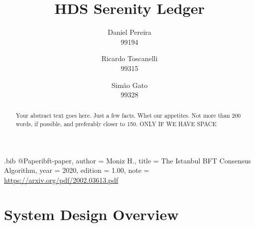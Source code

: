 \usepackage{filecontents}

\begin{filecontents}{\jobname.bib}
@Paper{ibft-paper,
  author =       {Moniz H.},
  title =        {The Istanbul BFT Consensus Algorithm},
  year =         2020,
  edition =      {1.00},
  note =         {\url{https://arxiv.org/pdf/2002.03613.pdf}}
}
\end{filecontents}



\date{}

\title{\Large \bf HDS Serenity Ledger}

\author{
{\rm Daniel Pereira}\\
99194
\and
{\rm Ricardo Toscanelli}\\
99315
\and
{\rm Simão Gato}\\
99328
} %

\maketitle

\begin{abstract}
Your abstract text goes here. Just a few facts. Whet our appetites.
Not more than 200 words, if possible, and preferably closer to 150.
ONLY IF WE HAVE SPACE
\end{abstract}


\section{System Design Overview}


